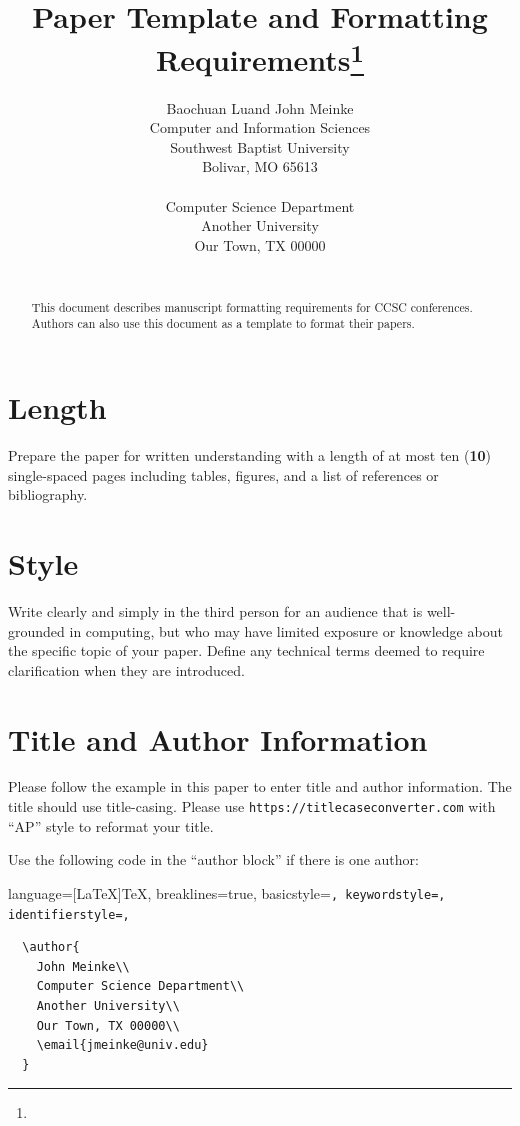 \documentclass{article}
\title{Paper Template and Formatting Requirements\footnote{\protect}
}
\author{
Baochuan Lu\affmark[1] and John Meinke\affmark[2]\\
\affmark[1]Computer and Information Sciences\\
Southwest Baptist University\\
Bolivar, MO 65613\\
\email{blu@sbuniv.edu}\\
\affmark[2]Computer Science Department\\
Another University\\
Our Town, TX 00000\\
\email{jmeinke@univ.edu}\\
}
\begin{document}
\maketitle
\thispagestyle{empty}
\pagestyle{empty}

\begin{abstract}
This document describes manuscript formatting requirements for CCSC conferences.
Authors can also use this document as a template to format their papers.
\end{abstract}

\section{Length}
Prepare the paper for written understanding with a length of at most ten
(\textbf{10}) single-spaced pages including tables, figures, and a list of references or
bibliography.

\section{Style}
Write clearly and simply in the third person for an audience that is
well-grounded in computing, but who may have limited exposure or knowledge about
the specific topic of your paper. Define any technical terms deemed to require
clarification when they are introduced.

\section{Title and Author Information}
Please follow the example in this paper to enter title and author information.
The title should use title-casing. Please use \texttt{https://titlecaseconverter.com}
with ``AP'' style to reformat your title.

Use the following code in the ``author block'' if there is one author:

\lstset
{
    language=[LaTeX]TeX,
    breaklines=true,
    basicstyle=\tt\scriptsize,
    keywordstyle=\color{blue},
    identifierstyle=\color{magenta},
}

\begin{lstlisting}
  \author{
    John Meinke\\
    Computer Science Department\\
    Another University\\
    Our Town, TX 00000\\
    \email{jmeinke@univ.edu}
  }
\end{lstlisting}
\end{document}
